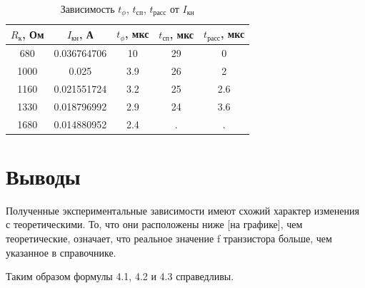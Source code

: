 \begin{table}[H]
	\begin{center}
	\caption{Зависимость $t_\phi$, $t_\text{сп}$, $t_\text{расс}$ от $I_{\text{кн}}$}
		\begin{tabular}{|c|c|c|c|c|}
		\hline 
		$R_\text{к}$, Ом & $I_{\text{кн}}$, А & $t_\phi$, мкс & $t_\text{сп}$, мкс & $t_\text{расс}$, мкс \\ 
		\hline 
		680 & 0.036764706 & 10 & 29 & 0 \\
		\hline
		1000 & 0.025 & 3.9 & 26 & 2 \\
		\hline
		1160 & 0.021551724 & 3.2 & 25 & 2.6 \\
		\hline
		1330 & 0.018796992 & 2.9 & 24 & 3.6 \\
		\hline
		1680 & 0.014880952 & 2.4 & . & . \\
		\hline
		\end{tabular} 
		\label{tabular:5}
	\end{center}
\end{table}


\section{Выводы}

Полученные экспериментальные зависимости имеют схожий характер изменения с теоретическими. То, что они расположены ниже [на графике], чем теоретические, означает, что реальное значение f транзистора больше, чем указанное в справочнике. 

Таким образом формулы 4.1, 4.2 и 4.3 справедливы.


